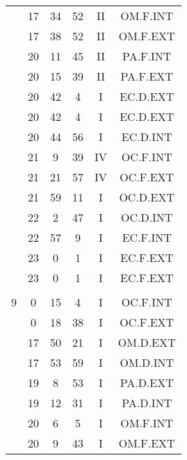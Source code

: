 \documentclass[12pt, a4paper]{article}
\begin{document}
\begin{multicols}{3}
{\begin{tabular}{c c c c c c}
	 	 	 	 & 17 & 34 & 52 & II & OM.F.INT\\%
	 	 	 	 & 17 & 38 & 52 & II & OM.F.EXT\\%
	 	 	 	 & 20 & 11 & 45 & II & PA.F.INT\\%
	 	 	 	 & 20 & 15 & 39 & II & PA.F.EXT\\%
	 	 	 	 & 20 & 42 & 4 & I & EC.D.EXT\\%
	 	 	 	 & 20 & 42 & 4 & I & EC.D.EXT\\%
	 	 	 	 & 20 & 44 & 56 & I & EC.D.INT\\%
	 	 	 	 & 21 & 9 & 39 & IV & OC.F.INT\\%
	 	 	 	 & 21 & 21 & 57 & IV & OC.F.EXT\\%
	 	 	 	 & 21 & 59 & 11 & I & OC.D.EXT\\%
	 	 	 	 & 22 & 2 & 47 & I & OC.D.INT\\%
	 	 	 	 & 22 & 57 & 9 & I & EC.F.INT\\%
	 	 	 	 & 23 & 0 & 1 & I & EC.F.EXT\\%
	 	 	 	 & 23 & 0 & 1 & I & EC.F.EXT\\%
	 	 	 	 & & & & & \\%
	 	 	 	9 & 0 & 15 & 4 & I & OC.F.INT\\%
	 	 	 	 & 0 & 18 & 38 & I & OC.F.EXT\\%
	 	 	 	 & 17 & 50 & 21 & I & OM.D.EXT\\%
	 	 	 	 & 17 & 53 & 59 & I & OM.D.INT\\%
	 	 	 	 & 19 & 8 & 53 & I & PA.D.EXT\\%
	 	 	 	 & 19 & 12 & 31 & I & PA.D.INT\\%
	 	 	 	 & 20 & 6 & 5 & I & OM.F.INT\\%
	 	 	 	 & 20 & 9 & 43 & I & OM.F.EXT\\%

\end{tabular}}
\end{multicols}
\end{document}
